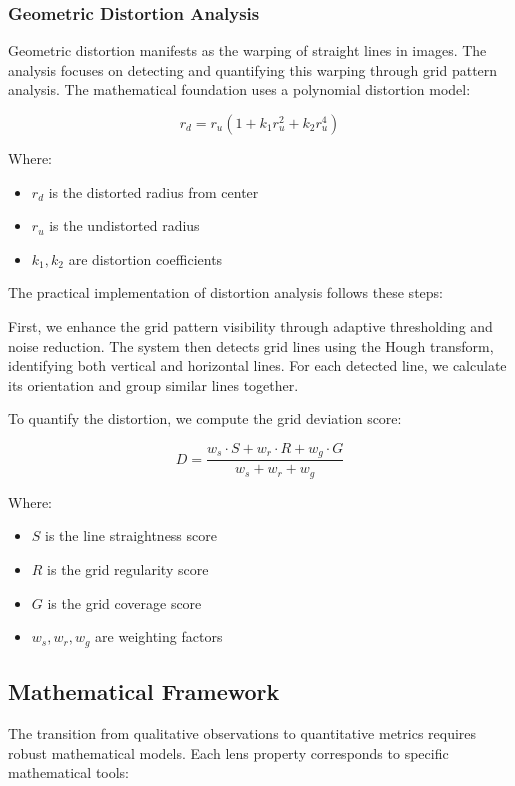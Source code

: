 \subsubsection{Geometric Distortion Analysis}
Geometric distortion manifests as the warping of straight lines in images. The analysis focuses on detecting and quantifying this warping through grid pattern analysis. The mathematical foundation uses a polynomial distortion model:

\begin{equation}
r_d = r_u \left(1 + k_1 r_u^2 + k_2 r_u^4\right)
\end{equation}

Where:
\begin{itemize}
    \item \( r_d \) is the distorted radius from center
    \item \( r_u \) is the undistorted radius
    \item \( k_1, k_2 \) are distortion coefficients
\end{itemize}

The practical implementation of distortion analysis follows these steps:

First, we enhance the grid pattern visibility through adaptive thresholding and noise reduction. The system then detects grid lines using the Hough transform, identifying both vertical and horizontal lines. For each detected line, we calculate its orientation and group similar lines together.

To quantify the distortion, we compute the grid deviation score:

\begin{equation}
D = \frac{w_s \cdot S + w_r \cdot R + w_g \cdot G}{w_s + w_r + w_g}
\end{equation}

Where:
\begin{itemize}
    \item \( S \) is the line straightness score
    \item \( R \) is the grid regularity score
    \item \( G \) is the grid coverage score
    \item \( w_s, w_r, w_g \) are weighting factors
\end{itemize}

\subsection{Mathematical Framework}
The transition from qualitative observations to quantitative metrics requires robust mathematical models. Each lens property corresponds to specific mathematical tools:

